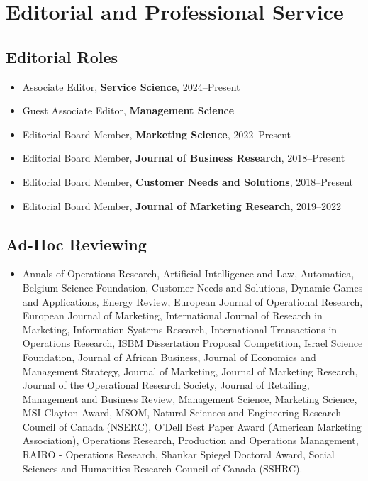 \documentclass[10pt]{article}
\begin{document}
\section{Editorial and Professional Service}

\subsection{Editorial Roles}

\begin{itemize}
    \item[] Associate Editor, \textbf{Service Science}, 2024--Present
    \item[] Guest Associate Editor, \textbf{Management Science}
    \item[] Editorial Board Member, \textbf{Marketing Science}, 2022--Present
    \item[] Editorial Board Member, \textbf{Journal of Business Research}, 2018--Present
    \item[] Editorial Board Member, \textbf{Customer Needs and Solutions}, 2018--Present
    \item[] Editorial Board Member, \textbf{Journal of Marketing Research}, 2019--2022
    \end{itemize}

\subsection{Ad-Hoc Reviewing}

\begin{itemize}
 \item[] Annals of Operations Research, Artificial Intelligence and Law, Automatica, Belgium Science Foundation, Customer Needs and Solutions, Dynamic Games and Applications, Energy Review, European Journal of Operational Research, European Journal of Marketing, International Journal of Research in Marketing, Information Systems Research, International Transactions in Operations Research, ISBM Dissertation Proposal Competition, Israel Science Foundation, Journal of African Business,  Journal of Economics and Management Strategy, Journal of Marketing, Journal of Marketing Research, Journal of the Operational Research Society, Journal of Retailing, Management and Business Review, Management Science,  Marketing Science,  MSI Clayton Award, MSOM, Natural Sciences and Engineering Research Council of Canada (NSERC), O'Dell Best Paper Award (American Marketing Association), Operations Research, Production and Operations Management, RAIRO - Operations Research, Shankar Spiegel Doctoral Award,  Social Sciences and Humanities Research Council of Canada (SSHRC).
\end{itemize}
\end{document}
